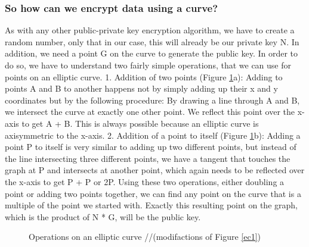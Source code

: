 \subsubsection{So how can we encrypt data using a curve?}
As with any other public-private key encryption algorithm, we have to create a random number, only that in our case, this will already be our private key N. In addition, we need a point G on the curve to generate the public key. In order to do so, we have to understand two fairly simple operations, that we can use for points on an elliptic curve.
1. Addition of two points (Figure \ref{ec2}a): Adding to points A and B to another happens not by simply adding up their x and y coordinates but by the following procedure: By drawing a line through A and B, we intersect the curve at exactly one other point. We reflect this point over the x-axis to get A + B. This is always possible because an elliptic curve is axisymmetric to the x-axis.
2. Addition of a point to itself (Figure \ref{ec2}b): Adding a point P to itself is very similar to adding up two different points, but instead of the line intersecting three different points, we have a tangent that touches the graph at P and intersects at another point, which again needs to be reflected over the x-axis to get P + P or 2P.
Using these two operations, either doubling a point or adding two points together, we can find any point on the curve that is a multiple of the point we started with. Exactly this resulting point on the graph, which is the product of N * G, will be the public key.

\begin{figure}%
    \centering
    \qquad
\caption{Operations on an elliptic curve //(modifactions of Figure \ref{ec1})}%
\label{ec2}
\end{figure}

